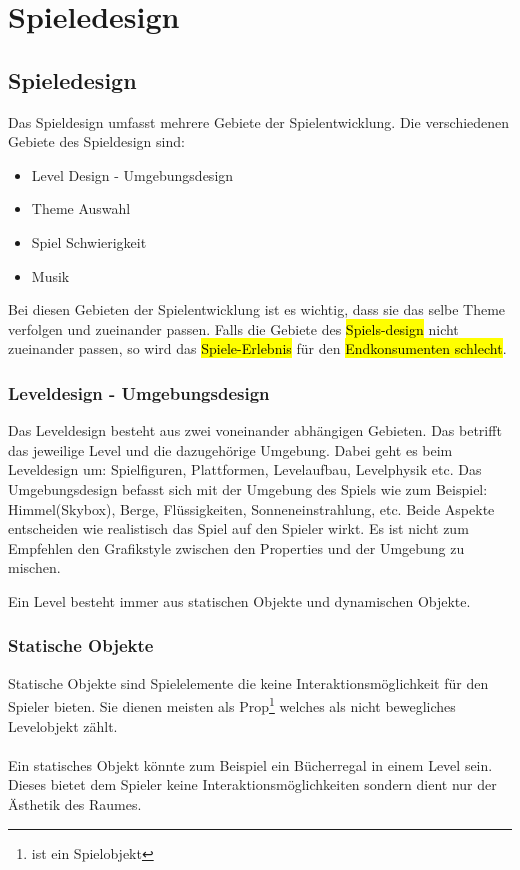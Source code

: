 \pagebreak
{}
\chapter{Spieledesign} %
\section{Spieledesign} %

Das Spieldesign umfasst mehrere Gebiete der Spielentwicklung. Die verschiedenen Gebiete des Spieldesign sind:

\begin{itemize} %
    \item Level Design - Umgebungsdesign 
    \item Theme Auswahl 
    \item Spiel Schwierigkeit 
    \item Musik
\end{itemize}

Bei diesen Gebieten der Spielentwicklung ist es wichtig, dass sie das selbe Theme verfolgen und zueinander passen. Falls die Gebiete des \hl{Spiels-design} nicht zueinander passen, so wird das \hl{Spiele-Erlebnis} für den \hl{Endkonsumenten schlecht}. 

\subsection{Leveldesign - Umgebungsdesign}
Das Leveldesign besteht aus zwei voneinander abhängigen Gebieten. 
Das betrifft das jeweilige Level und die dazugehörige Umgebung. Dabei geht es beim Leveldesign um: Spielfiguren, Plattformen, Levelaufbau, Levelphysik etc. 
Das Umgebungsdesign befasst sich mit der Umgebung des Spiels wie zum Beispiel: Himmel(Skybox), Berge, Flüssigkeiten, Sonneneinstrahlung, etc. 
Beide Aspekte entscheiden wie realistisch das Spiel auf den Spieler wirkt. Es ist nicht zum Empfehlen den Grafikstyle zwischen den Properties und der Umgebung zu mischen.

Ein Level besteht immer aus statischen Objekte und dynamischen Objekte. %

\pagebreak

\subsection{Statische Objekte} %
Statische Objekte sind Spielelemente die keine Interaktionsmöglichkeit für den Spieler bieten. Sie dienen meisten als Prop\footnote[1]{ist ein Spielobjekt} welches als nicht bewegliches Levelobjekt zählt. \\\\
Ein statisches Objekt könnte zum Beispiel ein Bücherregal in einem Level sein. Dieses bietet dem Spieler keine Interaktionsmöglichkeiten sondern dient nur der Ästhetik des Raumes. \\


